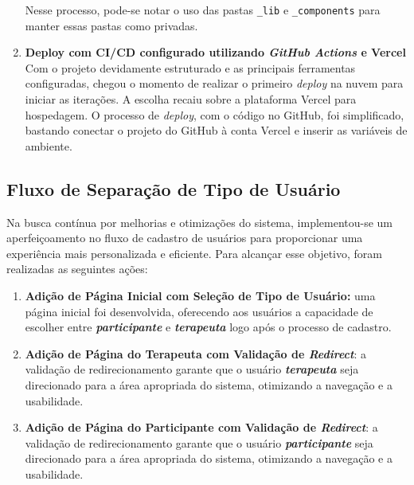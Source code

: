 \begin{enumerate}
    Nesse processo, pode-se notar o uso das pastas \verb|_lib| e \verb|_components| para manter essas pastas como privadas.

    \item\textbf{Deploy com CI/CD configurado utilizando \textit{GitHub Actions} e Vercel}\\
    
    Com o projeto devidamente estruturado e as principais ferramentas configuradas, chegou o momento de realizar o primeiro \textit{deploy} na nuvem para iniciar as iterações. A escolha recaiu sobre a plataforma Vercel para hospedagem. O processo de \textit{deploy}, com o código no GitHub, foi simplificado, bastando conectar o projeto do GitHub à conta Vercel e inserir as variáveis de ambiente.
    
\end{enumerate}


\subsection{Fluxo de Separação de Tipo de Usuário}
    Na busca contínua por melhorias e otimizações do sistema, implementou-se um aperfeiçoamento no fluxo de cadastro de usuários para proporcionar uma experiência mais personalizada e eficiente. Para alcançar esse objetivo, foram realizadas as seguintes ações:
\begin{enumerate}

    \item \textbf{Adição de Página Inicial com Seleção de Tipo de Usuário:} uma página inicial foi desenvolvida, oferecendo aos usuários a capacidade de escolher entre \textit{\textbf{participante}} e \textit{\textbf{terapeuta}} logo após o processo de cadastro.
    
    \item \textbf{Adição de Página do Terapeuta com Validação de \textit{Redirect}}: a validação de redirecionamento garante que o usuário \textit{\textbf{terapeuta}} seja direcionado para a área apropriada do sistema, otimizando a navegação e a usabilidade.
    
    \item \textbf{Adição de Página do Participante com Validação de \textit{Redirect}}: a validação de redirecionamento garante que o usuário \textit{\textbf{participante}} seja direcionado para a área apropriada do sistema, otimizando a navegação e a usabilidade.
\end{enumerate}

